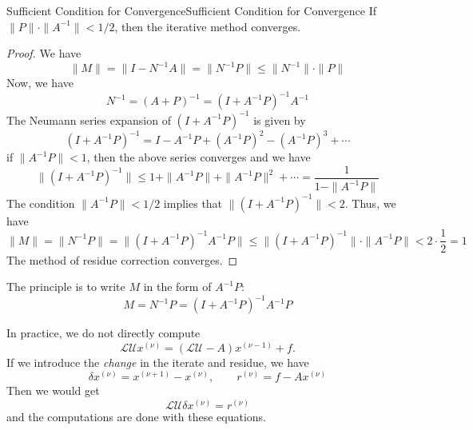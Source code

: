 \documentclass[../main.tex]{subfiles}
\begin{document}
\begin{lemma}{Sufficient Condition for Convergence}{Sufficient Condition for Convergence}
	If $\| P \| \cdot \|A^{-1}\| < 1 / 2$, then the iterative method converges.
\end{lemma}
\begin{proof}
	We have
	\begin{equation*}
		\| M \| = \| I - N^{-1} A \| = \| N^{-1} P \| \leq \| N^{-1} \| \cdot \| P \|
	\end{equation*}
	Now, we have
	\begin{equation*}
		N^{-1} = (A + P)^{-1} = (I + A^{-1} P)^{-1} A^{-1}
	\end{equation*}
	The Neumann series expansion of $(I + A^{-1} P)^{-1}$ is given by
	\begin{equation*}
		(I + A^{-1} P)^{-1} = I - A^{-1} P + (A^{-1} P)^2 - (A^{-1} P)^3 + \cdots
	\end{equation*}
	if $\| A^{-1} P \| < 1$, then the above series converges and we have
	\begin{equation*}
		\| (I + A^{-1} P)^{-1} \| \leq 1 + \| A^{-1} P \| + \| A^{-1} P \|^2 + \cdots = \frac{1}{1 - \| A^{-1} P \|}
	\end{equation*}
	The condition $\| A^{-1} P \| < 1 / 2$ implies that $\| (I + A^{-1} P)^{-1} \| < 2$. Thus, we have
	\begin{equation*}
		\| M \| = \| N^{-1} P \| = \| (I + A^{-1} P)^{-1} A^{-1} P \| \leq \| (I + A^{-1} P)^{-1} \| \cdot \| A^{-1} P \| < 2 \cdot \frac{1}{2} = 1
	\end{equation*}
	The method of residue correction converges.
\end{proof}
\begin{remark}
	The principle is to write $M$ in the form of $A^{-1} P$:
	\begin{equation*}
		M = N^{-1} P = (I + A^{-1} P)^{-1} A^{-1} P
	\end{equation*}
\end{remark}
In practice, we do not directly compute
\begin{equation*}
	\mathcal{L}\mathcal{U} x^{(\nu)} = (\mathcal{L}\mathcal{U} - A) x^{(\nu-1)} + f.
\end{equation*}
If we introduce the \emph{change} in the iterate and residue, we have
\begin{equation}
	\delta x^{(\nu)} = x^{(\nu+1)} - x^{(\nu)}, \qquad r^{(\nu)} = f - A x^{(\nu)}
\end{equation}
Then we would get
\begin{equation}
	\mathcal{L}\mathcal{U} \delta x^{(\nu)} = r^{(\nu)}
\end{equation}
and the computations are done with these equations.
\end{document}
